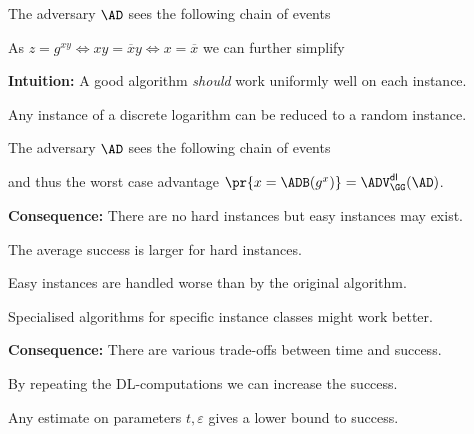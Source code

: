 \documentclass[landscape,footrule]{foils}
\newcommand{\lastline}{\vspace*{-2ex}}
\begin{document}
The adversary $\AD$ sees the following chain of events 

As $z=g^{xy} \Leftrightarrow xy = \overline{x}y \Leftrightarrow x=\overline{x}$ we can further simplify



\textbf{Intuition:} A good algorithm \emph{should} work uniformly well on each instance.




Any instance of a discrete logarithm can be reduced to a random instance.  


The adversary $\AD$ sees the following chain of events 


and thus the worst case advantage $\pr{x=\ADB(g^x)}=\advDLXX{\GG}{\AD}$.\lastline



\textbf{Consequence:} There are no hard instances but easy instances may exist.


\begin{triangles}
  \item The average success is larger for hard instances.
  \item Easy instances are handled worse than by the original algorithm. 
  \item Specialised algorithms for specific instance classes might work better.
\end{triangles}



\textbf{Consequence:} There are various trade-offs between time and success.
\begin{triangles}
  \item By repeating the DL-computations we can increase the success.
  \item Any estimate on parameters $t,\varepsilon$ gives a lower bound to success.
\end{triangles}

\end{document}
